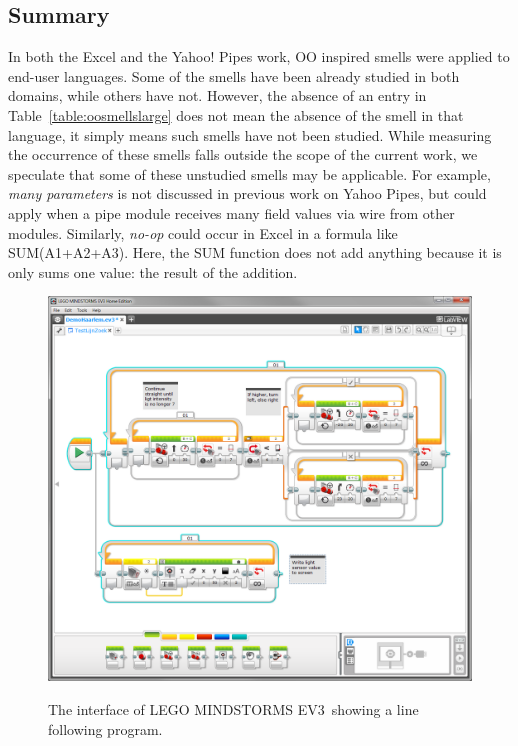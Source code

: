 \documentclass{sig-alternate}
\newcommand{\todo}[1]{\textbf{TODO: #1}}
\newcommand{\ms}{LEGO MINDSTORMS EV3}
\begin{document}
\subsection{Summary}
In both the Excel and the Yahoo! Pipes work, OO inspired smells were applied to end-user languages. Some of the smells have been already studied in both domains, while others have not. However, the absence of an entry in Table~\ref{table:oosmellslarge} does not mean the absence of the smell in that language, it simply means such smells have not been studied. While measuring the occurrence of these smells falls outside the scope of the current work, we speculate
that some of these unstudied smells may be applicable. 
For example, \emph{many parameters} is not discussed in previous work on Yahoo Pipes, but could apply when a pipe module receives many field values via wire from other modules. 
Similarly, \emph{no-op} could occur in Excel in a formula like SUM(A1+A2+A3). Here, the SUM function does not add anything because it is only sums one value: the result of the addition. 


\begin{figure} [ht]
\caption{The interface of \ms~showing a line following program.}
\centering
\includegraphics[width=\columnwidth]{img/ms}
\label{fig:ms}
\end{figure}


\end{document}
